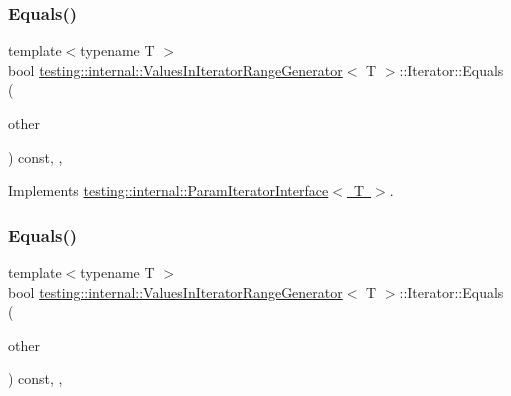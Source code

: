 \subsubsection{\texorpdfstring{Equals()}{Equals()}\hspace{0.1cm}{\footnotesize\ttfamily [2/3]}}
{\footnotesize\ttfamily template$<$typename T $>$ \\
bool \mbox{\hyperlink{classtesting_1_1internal_1_1_values_in_iterator_range_generator}{testing\+::internal\+::\+Values\+In\+Iterator\+Range\+Generator}}$<$ T $>$\+::Iterator\+::\+Equals (\begin{DoxyParamCaption}\item[{const \mbox{\hyperlink{classtesting_1_1internal_1_1_param_iterator_interface}{Param\+Iterator\+Interface}}$<$ T $>$ \&}]{other }\end{DoxyParamCaption}) const\hspace{0.3cm}{\ttfamily [inline]}, {\ttfamily [override]}, {\ttfamily [virtual]}}



Implements \mbox{\hyperlink{classtesting_1_1internal_1_1_param_iterator_interface_a9d811697a752d46f7bd6a0082f9040a3}{testing\+::internal\+::\+Param\+Iterator\+Interface$<$ T $>$}}.

\mbox{\label{classtesting_1_1internal_1_1_values_in_iterator_range_generator_1_1_iterator_a75604bc318aca22ff8607b68bfb44e96}} 
\subsubsection{\texorpdfstring{Equals()}{Equals()}\hspace{0.1cm}{\footnotesize\ttfamily [3/3]}}
{\footnotesize\ttfamily template$<$typename T $>$ \\
bool \mbox{\hyperlink{classtesting_1_1internal_1_1_values_in_iterator_range_generator}{testing\+::internal\+::\+Values\+In\+Iterator\+Range\+Generator}}$<$ T $>$\+::Iterator\+::\+Equals (\begin{DoxyParamCaption}\item[{const \mbox{\hyperlink{classtesting_1_1internal_1_1_param_iterator_interface}{Param\+Iterator\+Interface}}$<$ T $>$ \&}]{other }\end{DoxyParamCaption}) const\hspace{0.3cm}{\ttfamily [inline]}, {\ttfamily [override]}, {\ttfamily [virtual]}}



